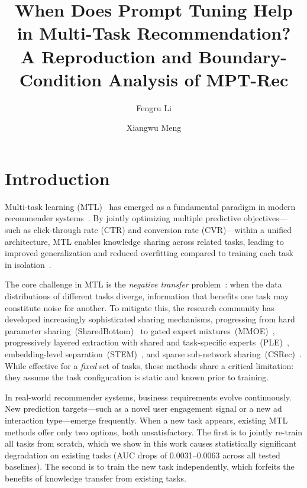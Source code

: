 \documentclass[review,anonymous]{acmart}
\title{When Does Prompt Tuning Help in Multi-Task Recommendation?\texorpdfstring{\\}{ --- }A Reproduction and Boundary-Condition Analysis of MPT-Rec}
\author{Fengru Li}
\affiliation{%
  \institution{Beijing University of Posts and Telecommunications}
  \city{Beijing}
  \country{China}
}
\author{Xiangwu Meng}
\affiliation{%
  \institution{Beijing University of Posts and Telecommunications}
  \city{Beijing}
  \country{China}
}
\begin{document}
\maketitle

\section{Introduction}
\label{sec:introduction}

Multi-task learning (MTL)~\cite{caruana1997multitask,ruder2017overview} has emerged
as a fundamental paradigm in modern recommender systems~\cite{ma2018modeling,
tang2020progressive,zhao2019recommending}. By jointly optimizing multiple predictive
objectives---such as click-through rate (CTR) and conversion rate (CVR)---within a
unified architecture, MTL enables knowledge sharing across related tasks, leading to
improved generalization and reduced overfitting compared to training each task in
isolation~\cite{crawshaw2020multitask,wang2023multi}.

The core challenge in MTL is the \emph{negative transfer} problem~\cite{ma2018modeling,
tang2020progressive}: when the data distributions of different tasks diverge,
information that benefits one task may constitute noise for another. To mitigate this,
the research community has developed increasingly sophisticated sharing mechanisms,
progressing from hard parameter sharing~(SharedBottom)~\cite{ruder2017overview} to
gated expert mixtures~(MMOE)~\cite{ma2018modeling}, progressively layered extraction
with shared and task-specific experts~(PLE)~\cite{tang2020progressive},
embedding-level separation~(STEM)~\cite{su2023stem}, and sparse sub-network
sharing~(CSRec)~\cite{bai2022contrastive}. While effective for a \emph{fixed} set
of tasks, these methods share a critical limitation: they assume the task
configuration is static and known prior to training.

In real-world recommender systems, business requirements evolve continuously.
New prediction targets---such as a novel user engagement signal or a new ad
interaction type---emerge frequently. When a new task appears, existing MTL methods
offer only two options, both unsatisfactory. The first is to jointly re-train all tasks
from scratch, which we show in this work causes statistically significant degradation
on existing tasks (AUC drops of 0.0031--0.0063 across all tested baselines). The
second is to train the new task independently, which forfeits the benefits of
knowledge transfer from existing tasks.
\end{document}

